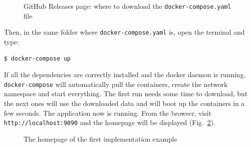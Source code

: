 \begin{figure}[h!]
    \centering
    \caption{GitHub Releases page: where to download the \texttt{docker-compose.yaml} file}
    \label{fig:rel1}
\end{figure}

\newpage

\noindent Then, in the same folder where \texttt{docker-compose.yaml} is, open the terminal and type:
\begin{lstlisting}[language=bash]
  $ docker-compose up
\end{lstlisting}

\noindent If all the dependencies are correctly installed and the docker daemon is running, \texttt{docker-compose} will automatically pull the containers, create the network namespace and start everything. The first run needs some time to download, but the next ones will use the downloaded data and will boot up the containers in a few seconds. The application now is running. From the browser, visit \texttt{http://localhost:9090} and the homepage will be displayed (Fig.~\ref{fig:home1}).

\begin{figure}[h!]
    \centering
    
    \caption{The homepage of the first implementation example}
    \label{fig:home1}
\end{figure}


